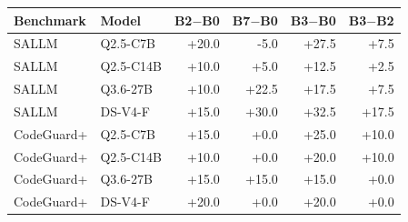 \begin{tabular}{llrrrr}
\toprule
Benchmark & Model & B2$-$B0 & B7$-$B0 & B3$-$B0 & B3$-$B2 \\
\midrule
SALLM & Q2.5-C7B & +20.0 & -5.0 & +27.5 & +7.5 \\
SALLM & Q2.5-C14B & +10.0 & +5.0 & +12.5 & +2.5 \\
SALLM & Q3.6-27B & +10.0 & +22.5 & +17.5 & +7.5 \\
SALLM & DS-V4-F & +15.0 & +30.0 & +32.5 & +17.5 \\
CodeGuard+ & Q2.5-C7B & +15.0 & +0.0 & +25.0 & +10.0 \\
CodeGuard+ & Q2.5-C14B & +10.0 & +0.0 & +20.0 & +10.0 \\
CodeGuard+ & Q3.6-27B & +15.0 & +15.0 & +15.0 & +0.0 \\
CodeGuard+ & DS-V4-F & +20.0 & +0.0 & +20.0 & +0.0 \\
\bottomrule
\end{tabular}
